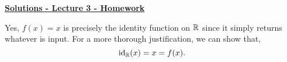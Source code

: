 \documentclass[12pt]{article} %
\begin{document}
	\renewcommand*{\coursecode}{MATH 235} %
	\renewcommand*{\assgnnumber}{Assignment 1} %
	\renewcommand*{\submdate}{September 14, 2021} %
	\renewcommand*{\studentfname}{Abdullah} %
	\renewcommand*{\studentlname}{Zubair} %
    \renewcommand*{\proofname}{Proof:}

	\renewcommand\qedsymbol{$\blacksquare$}
	\setfigpath
	\fancyhfoffset[L,O]{0pt} %




\begin{center}
	\textbf{\underline{\Huge{Solutions - Lecture 3 - Homework}}}
\end{center}
\begin{qstn}
  \begin{solution}
    Yes, $f(x) = x$ is precisely the identity function on $\mathbb R$ since it simply returns whatever is input. 
    For a more thorough justification, we can show that,
     \[
        \operatorname{id}_\mathbb R(x) = x = f(x)
    .\] 
  \end{solution}
\end{qstn}
\end{document}
